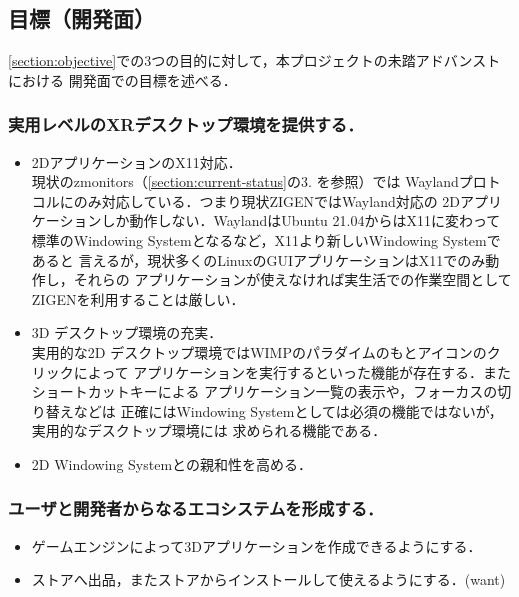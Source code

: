 \subsection{目標（開発面）}

\ref*{section:objective}での3つの目的に対して，本プロジェクトの未踏アドバンストにおける
開発面での目標を述べる．

\subsubsection*{実用レベルのXRデスクトップ環境を提供する．}

\begin{itemize}
  \item 2DアプリケーションのX11対応．\\
        現状のzmonitors（\ref{section:current-status}の3. を参照）では %
        Waylandプロトコルにのみ対応している．つまり現状ZIGENではWayland対応の
        2Dアプリケーションしか動作しない．WaylandはUbuntu 21.04からはX11に変わって
        標準のWindowing Systemとなるなど，X11より新しいWindowing Systemであると
        言えるが，現状多くのLinuxのGUIアプリケーションはX11でのみ動作し，それらの
        アプリケーションが使えなければ実生活での作業空間としてZIGENを利用することは厳しい．

  \item 3D デスクトップ環境の充実．\\
        実用的な2D デスクトップ環境ではWIMPのパラダイムのもとアイコンのクリックによって
        アプリケーションを実行するといった機能が存在する．またショートカットキーによる
        アプリケーション一覧の表示や，フォーカスの切り替えなどは
        正確にはWindowing Systemとしては必須の機能ではないが，実用的なデスクトップ環境には
        求められる機能である．
  \item 2D Windowing Systemとの親和性を高める．
\end{itemize}

\subsubsection*{ユーザと開発者からなるエコシステムを形成する．}

\begin{itemize}
  \item ゲームエンジンによって3Dアプリケーションを作成できるようにする．
  \item ストアへ出品，またストアからインストールして使えるようにする．(want)
\end{itemize}

